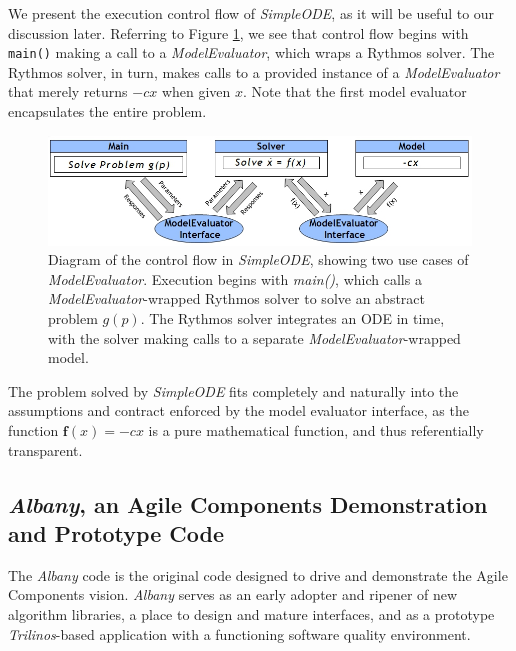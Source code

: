\documentclass[pdf,ps2pdf,12pt,report]{SANDreport}
\theoremstyle{plain}
\theoremstyle{definition}
\theoremstyle{remark}
\numberwithin{equation}{section}
\begin{document}
We present the execution control flow of \emph{SimpleODE}, as it will be useful to our discussion later. Referring to Figure \ref{fig:SimpleODEInterface}, we see that control flow begins with \verb"main()" making a call to a \emph{ModelEvaluator}, which wraps a Rythmos solver. The Rythmos solver, in turn, makes calls to a provided instance of a \emph{ModelEvaluator} that merely returns $-cx$ when given $x$. Note that the first model evaluator encapsulates the entire problem.

\begin{figure}[h!]
\begin{center}
	\includegraphics[width=\linewidth]{SimpleODEInterface}
 \end{center}
 \caption{Diagram of the control flow in \emph{SimpleODE}, showing two use cases of \emph{ModelEvaluator}. Execution begins with \emph{main()}, which calls a \emph{ModelEvaluator}-wrapped Rythmos solver to solve an abstract problem $g(p)$. The Rythmos solver integrates an ODE in time, with the solver making calls to a separate \emph{ModelEvaluator}-wrapped model.}
\label{fig:SimpleODEInterface}
\end{figure}

The problem solved by \emph{SimpleODE} fits completely and naturally into the assumptions and contract enforced by the model evaluator interface, as the function $\mathbf{f}(x) = -c x$ is a pure mathematical function, and thus referentially transparent.

\subsection{\emph{Albany}, an Agile Components Demonstration and Prototype Code} \label{sec:albany}

The \emph{Albany} code \cite{AlbanyWebPage:2011} is the original code designed to drive and demonstrate the Agile Components vision. \emph{Albany} serves as an early adopter and ripener of new algorithm libraries, a place to design and mature interfaces, and as a prototype \emph{Trilinos}-based application with a functioning software quality environment.
\end{document}
